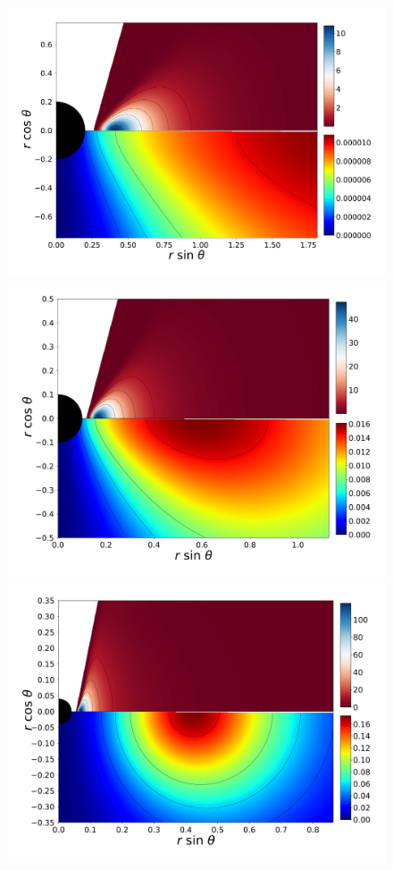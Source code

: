 \documentclass[twocolumn,aps,showpacs,showkeys,prd,superscriptaddress,byrevtex, amsmath]{revtex4-1}
\begin{document}
\begin{figure}
\hspace{-0.2cm}
\\
\includegraphics[scale=0.12]{figures/fig5_I__10.pdf}
\hspace{-0.3cm}
\includegraphics[scale=0.12]{figures/fig5_IV__10.pdf}
\hspace{-0.3cm}
\includegraphics[scale=0.12]{figures/fig5_VII__10.pdf}

\end{figure}
\end{document}
